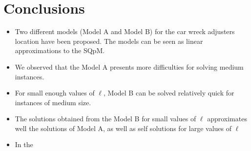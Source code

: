 \chapter{Conclusions}
\begin{itemize}
\item Two different models (Model A and Model B)
  for the car wreck adjusters location have been proposed. 
  The models can be seen as linear approximations to the SQpM.
\item We observed that the Model A
  presents more difficulties for solving medium instances.
\item For small enough values of $\ell$,
  Model B can be solved relatively quick
  for instances of medium size.
\item The solutions obtained from the Model B
  for small values of $\ell$
  approximates well the solutions of Model A,
  as well as self solutions for large values of $\ell$
\item In the 
\end{itemize}

